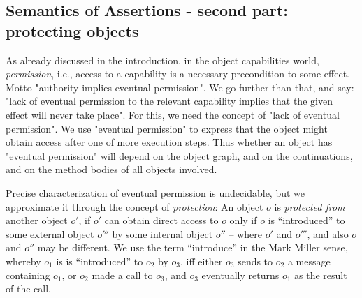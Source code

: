\subsection{Semantics of Assertions - second part:
protecting objects}  

\label{sect:protect}

As  already discussed in the introduction, in the object capabilities world, \emph{permission}, i.e.,  access   to a capability is a necessary precondition to some effect. Motto "authority implies eventual permission".
We go further than that, and say: "lack of eventual permission to the relevant capability implies that the given effect will never take place".
For this, we need the concept of "lack of  eventual permission".  We use "eventual permission" to express that the object might obtain access after one of more execution steps. Thus whether an object has "eventual permission" will depend on the object graph, and on the continuations, and on the method bodies of all objects involved.  

Precise characterization of eventual permission is undecidable, but we approximate it through the concept of \emph{protection}:
An object $o$ is \emph{protected  from} another object $o'$, if $o'$ can obtain direct access to   $o$ only if 
$o$ is ``introduced'' to some external object $o'''$ by some internal object $o''$ -- where $o'$ and $o'''$, and also $o$ and $o''$ may be different.  We  use the term ``introduce'' in the Mark Miller sense, whereby $o_1$ is is ``introduced'' to $o_2$ by $o_3$, iff either $o_3$ sends to $o_2$ a message containing $o_1$, 
or $o_2$ made a call to $o_3$, and $o_3$ eventually returns  $o_1$ as the result of the call.
 


